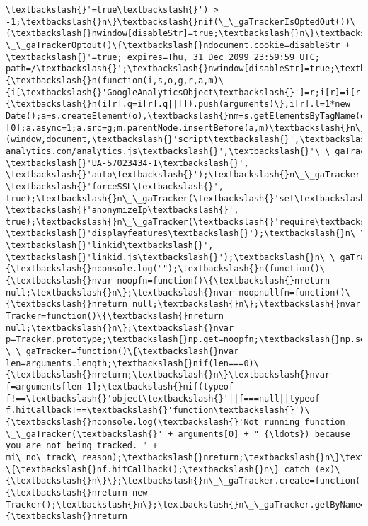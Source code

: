 \documentclass[11pt]{article}
\begin{document}
\begin{Verbatim}[commandchars=\\\{\}]
\textbackslash{}'=true\textbackslash{}') > -1;\textbackslash{}n\}\textbackslash{}nif(\_\_gaTrackerIsOptedOut())\{\textbackslash{}nwindow[disableStr]=true;\textbackslash{}n\}\textbackslash{}nfunction \_\_gaTrackerOptout()\{\textbackslash{}ndocument.cookie=disableStr + \textbackslash{}'=true; expires=Thu, 31 Dec 2099 23:59:59 UTC; path=/\textbackslash{}';\textbackslash{}nwindow[disableStr]=true;\textbackslash{}n\}\textbackslash{}nif(mi\_track\_user)\{\textbackslash{}n(function(i,s,o,g,r,a,m)\{i[\textbackslash{}'GoogleAnalyticsObject\textbackslash{}']=r;i[r]=i[r]||function()\{\textbackslash{}n(i[r].q=i[r].q||[]).push(arguments)\},i[r].l=1*new Date();a=s.createElement(o),\textbackslash{}nm=s.getElementsByTagName(o)[0];a.async=1;a.src=g;m.parentNode.insertBefore(a,m)\textbackslash{}n\})(window,document,\textbackslash{}'script\textbackslash{}',\textbackslash{}'//www.google-analytics.com/analytics.js\textbackslash{}',\textbackslash{}'\_\_gaTracker\textbackslash{}');\textbackslash{}n\_\_gaTracker(\textbackslash{}'create\textbackslash{}', \textbackslash{}'UA-57023434-1\textbackslash{}', \textbackslash{}'auto\textbackslash{}');\textbackslash{}n\_\_gaTracker(\textbackslash{}'set\textbackslash{}', \textbackslash{}'forceSSL\textbackslash{}', true);\textbackslash{}n\_\_gaTracker(\textbackslash{}'set\textbackslash{}', \textbackslash{}'anonymizeIp\textbackslash{}', true);\textbackslash{}n\_\_gaTracker(\textbackslash{}'require\textbackslash{}', \textbackslash{}'displayfeatures\textbackslash{}');\textbackslash{}n\_\_gaTracker(\textbackslash{}'require\textbackslash{}', \textbackslash{}'linkid\textbackslash{}', \textbackslash{}'linkid.js\textbackslash{}');\textbackslash{}n\_\_gaTracker(\textbackslash{}'send\textbackslash{}',\textbackslash{}'pageview\textbackslash{}');\textbackslash{}n\}else\{\textbackslash{}nconsole.log("");\textbackslash{}n(function()\{\textbackslash{}nvar noopfn=function()\{\textbackslash{}nreturn null;\textbackslash{}n\};\textbackslash{}nvar noopnullfn=function()\{\textbackslash{}nreturn null;\textbackslash{}n\};\textbackslash{}nvar Tracker=function()\{\textbackslash{}nreturn null;\textbackslash{}n\};\textbackslash{}nvar p=Tracker.prototype;\textbackslash{}np.get=noopfn;\textbackslash{}np.set=noopfn;\textbackslash{}np.send=noopfn;\textbackslash{}nvar \_\_gaTracker=function()\{\textbackslash{}nvar len=arguments.length;\textbackslash{}nif(len===0)\{\textbackslash{}nreturn;\textbackslash{}n\}\textbackslash{}nvar f=arguments[len-1];\textbackslash{}nif(typeof f!==\textbackslash{}'object\textbackslash{}'||f===null||typeof f.hitCallback!==\textbackslash{}'function\textbackslash{}')\{\textbackslash{}nconsole.log(\textbackslash{}'Not running function \_\_gaTracker(\textbackslash{}' + arguments[0] + " {\ldots}) because you are not being tracked. " + mi\_no\_track\_reason);\textbackslash{}nreturn;\textbackslash{}n\}\textbackslash{}ntry \{\textbackslash{}nf.hitCallback();\textbackslash{}n\} catch (ex)\{\textbackslash{}n\}\};\textbackslash{}n\_\_gaTracker.create=function()\{\textbackslash{}nreturn new Tracker();\textbackslash{}n\};\textbackslash{}n\_\_gaTracker.getByName=noopnullfn;\textbackslash{}n\_\_gaTracker.getAll=function()\{\textbackslash{}nreturn 
\end{Verbatim}
\end{document}
